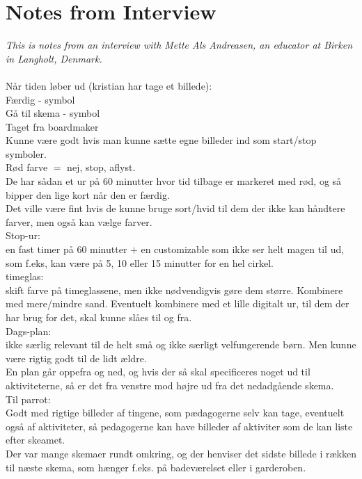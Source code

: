 \chapter{Notes from Interview}
\label{InterviewMette}
\textit{This is notes from an interview with Mette Als Andreasen, an educator at Birken in Langholt, Denmark.}\\
\\
N\aa{}r tiden l\o{}ber ud (kristian har tage et billede):\\
F\ae{}rdig - symbol\\
G\aa{} til skema - symbol\\
Taget fra boardmaker\\

Kunne v\ae{}re godt hvis man kunne s\ae{}tte egne billeder ind som start/stop symboler.\\


R\o{}d farve $=$ nej, stop, aflyst.\\

De har s\aa{}dan et ur p\aa{} 60 minutter hvor tid tilbage er markeret med r\o{}d, og s\aa{} bipper den lige kort n\aa{}r den er f\ae{}rdig.\\
  Det ville v\ae{}re fint hvis de kunne bruge sort/hvid til dem der ikke kan h\aa{}ndtere farver, men ogs\aa{} kan v\ae{}lge farver.\\

Stop-ur:\\
en fast timer p\aa{} 60 minutter $+$ en customizable som ikke ser helt magen til ud, som f.eks, kan v\ae{}re p\aa{} 5, 10 eller 15 minutter for en hel cirkel.\\

timeglas:\\
skift farve p\aa{} timeglassene, men ikke n\o{}dvendigvis g\o{}re dem st\o{}rre. Kombinere med mere/mindre sand. Eventuelt kombinere med et lille digitalt ur, til dem der har brug for det, skal kunne sl\aa{}es til og fra.\\

Dags-plan:\\
ikke s\ae{}rlig relevant til de helt sm\aa{} og ikke s\ae{}rligt velfungerende b\o{}rn. Men kunne v\ae{}re rigtig godt til de lidt \ae{}ldre.\\
   En plan g\aa{}r oppefra og ned, og hvis der s\aa{} skal specificeres noget ud til aktiviteterne, s\aa{} er det fra venstre mod h\o{}jre ud fra det nedadg\aa{}ende skema.\\

Til parrot:\\
Godt med rigtige billeder af tingene, som p\ae{}dagogerne selv kan tage, eventuelt ogs\aa{} af aktiviteter, s\aa{} pedagogerne kan have billeder af aktiviter som de kan liste efter skeamet.\\

Der var mange skemaer rundt omkring, og der henviser det sidste billede i r\ae{}kken til n\ae{}ste skema, som h\ae{}nger f.eks. p\aa{} badev\ae{}relset eller i garderoben.